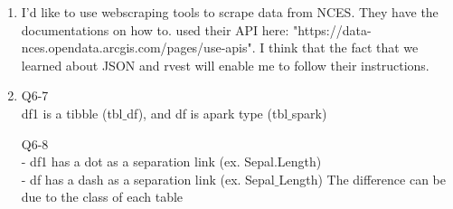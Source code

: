 \documentclass[12pt]{article}
\theoremstyle{definition}
\begin{document}
\begin{enumerate}
\item I'd like to use webscraping tools to scrape data from NCES. They have the documentations on how to. used their API here: "https://data-nces.opendata.arcgis.com/pages/use-apis". I think that the fact that we learned about JSON and rvest will enable me to follow their instructions.

\item 

Q6-7\\
df1 is a tibble (tbl$\_$df), and
df is apark type (tbl$\_$spark)

Q6-8\\
- df1  has a dot as a separation link (ex. Sepal.Length)\\
- df  has a dash as a separation link (ex. Sepal$\_$Length)
The difference can be due to the class of each table

\end{enumerate}
 
\end{document}

